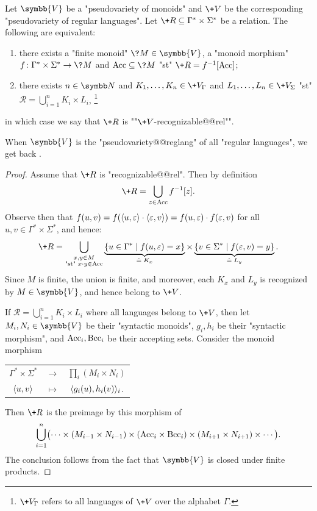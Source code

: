 \begin{proposition}
	\label{prop:Mezei-theorem-generalization}
	Let $\symbb{V}$ be a "pseudovariety of monoids"
	and $\+V$ be the corresponding "pseudovariety of regular languages".
	Let $\+R \subseteq \Gamma^* \times \Sigma^*$ be a relation.
	The following are equivalent:
	\begin{enumerate}
		\item there exists a "finite monoid" $\?M \in \symbb{V}$, a "monoid morphism"
		$f\colon \Gamma^* \times \Sigma^* \to \?M$ and $\Acc \subseteq \?M$
		"st" $\+R = f^{-1}[\Acc]$;
		\item there exists $n \in \N$
		and $K_1,\dotsc,K_n \in \+V_{\Gamma}$ and $L_1,\dotsc,L_n \in \+V_{\Sigma}$
		"st" $\mathcal{R} = \bigcup_{i=1}^n K_i \times L_i$,%
		\footnote{$\+V_{\Gamma}$ refers to all languages of $\+V$ over the alphabet $\Gamma$.}
	\end{enumerate}
	in which case we say that $\+R$ is \AP""$\+V$-recognizable@@rel"".
\end{proposition}

When $\symbb{V}$ is the "pseudovariety@@reglang" of all "regular languages",
we get back .

\begin{proof}
	Assume that $\+R$ is "recognizable@@rel". 
	Then by definition
	\[
		\+R = \bigcup_{z \in \Acc} f^{-1}[z].
	\]
	Observe then that $f(u,v) = f(\langle u,\varepsilon\rangle\cdot\langle\varepsilon,v\rangle)
	= f(u,\varepsilon)\cdot f(\varepsilon,v)$ for all $u,v \in \Gamma^* \times \Sigma^*$, and hence:
	\[
		\+R = \bigcup_{\substack{x,y \in M\\ \text{"st" } x\cdot y \in \Acc}}
		\underbrace{\{u \in \Gamma^* \mid f(u, \varepsilon) = x\}}_{\defeq \;K_x}
		\times \underbrace{\{v \in \Sigma^* \mid f(\varepsilon, v) = y\}}_{\defeq \;L_y}.
	\]
	Since $M$ is finite, the union is finite, and moreover, each $K_x$ and $L_y$ is
	recognized by $M \in \symbb{V}$, and hence belong to $\+V$.

	 If $\mathcal{R} = \bigcup_{i=1}^n K_i \times L_i$ 
		where all languages belong to $\+V$, then let $M_i,N_i \in \symbb{V}$
		be their "syntactic monoids", $g_i,h_i$ be their
		"syntactic morphism", and $\textrm{Acc}_i,\textrm{Bcc}_i$ be their accepting sets.
		Consider the monoid morphism
		\begin{center}
		\begin{tabular}{ccc}
			$\Gamma^* \times \Sigma^*$ & $\to$ & $\prod_{i}(M_i \times N_i)$ \\
			$\langle u,v\rangle$ & $\mapsto$ & $\langle g_i(u), h_i(v)\rangle_{i}$.
		\end{tabular}
		\end{center}
		Then $\+R$ is the preimage by this morphism of
		\[
			\bigcup_{i=1}^n \bigl(
			\cdots \times (M_{i-1}\times N_{i-1}) \times
			(\textrm{Acc}_i \times \textrm{Bcc}_i) \times (M_{i+1}\times N_{i+1}) \times \cdots \bigr).
		\]
		The conclusion follows from the fact that $\symbb{V}$ is closed under finite products.
\end{proof}

